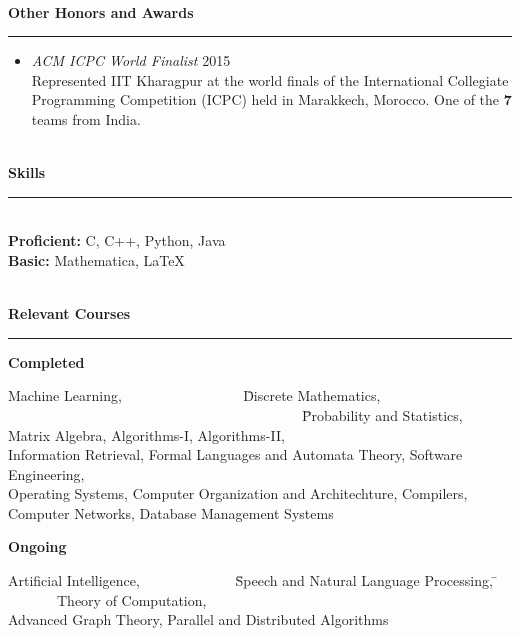 \documentclass[a4paper,10pt,oneside]{article}
\newcommand{\heading}[1]{
 {\Large \textbf{#1}}
  \vspace{0.4em}
  \hrule
  \vspace{0.4em}
}
\newcommand{\SmallEntryGap}{ \vspace{0.6em} }
\newcommand{\EntryGap}{ ~\\ }
\begin{document}

\EntryGap
\heading{Other Honors and Awards}
\begin{itemize}
\item \emph{ACM ICPC World Finalist} \hfill 2015\\
Represented IIT Kharagpur at the world finals of the International Collegiate Programming Competition (ICPC) held in Marakkech, Morocco. One of the \textbf{7} teams from India.
\end{itemize}



\EntryGap
\heading{Skills}
\EntryGap
\textbf{Proficient:} C, C++, Python, Java\\
\textbf{Basic:} Mathematica, \LaTeX



\EntryGap
\heading{Relevant Courses}
\SmallEntryGap
\textbf{Completed}
\begin{tabbing}
Machine Learning, ~~~~~~~~~~~~~~~~ \= Discrete Mathematics, ~~~~~~~~~~~~~~~~~~~~~~~~~~~~~~~~~~~~~~~~~~\= Probability and Statistics,\\
Matrix Algebra, \> Algorithms-I, \> Algorithms-II, \\
Information Retrieval, \> Formal Languages and Automata Theory, \> Software Engineering, \\
Operating Systems, \> Computer Organization and Architechture, \> Compilers, \\
Computer Networks, \> Database Management Systems
\end{tabbing}

\SmallEntryGap
\textbf{Ongoing}\\
\begin{tabbing}
Artificial Intelligence, ~~~~~~~~~~~~~\= Speech and Natural Language Processing, \= ~~~~~~~Theory of Computation,\\
Advanced Graph Theory, \> Parallel and Distributed Algorithms
\end{tabbing}
\end{document}
